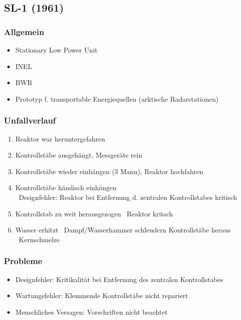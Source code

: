 \documentclass[12pt]{article}
\begin{document}
\subsection{SL-1 (1961)}

\subsubsection{Allgemein}
\begin{itemize}
	\item Stationary Low Power Unit
	\item INEL
	\item BWR
	\item Prototyp f. transportable Energiequellen (arktische Radarstationen)
\end{itemize}

\subsubsection{Unfallverlauf}
\begin{enumerate}
	\item Reaktor war heruntergefahren
	\item Kontrollstäbe ausgehängt, Messgeräte rein
	\item Kontrollstäbe wieder einhängen (3 Mann), Reaktor hochfahren
	\item Kontrollstäbe händisch einhängen\\
		\textrightarrow\ Designfehler: Reaktor bei Entfernung d. zentralen Kontrollstabes kritisch
	\item Kontrollstab zu weit herausgezogen \textrightarrow\ Reaktor kritsch
	\item Wasser erhitzt \textrightarrow\ Dampf/Wasserhammer schleudern Kontrollstäbe heraus \textrightarrow\ Kernschmelze
\end{enumerate}

\subsubsection{Probleme}
\begin{itemize}
	\item Designfehler: Kritikalität bei Entfernung des zentralen Kontrollstabes
	\item Wartungsfehler: Klemmende Kontrollstäbe nicht repariert
	\item Menschliches Versagen: Vorschriften nicht beachtet
\end{itemize}
\end{document}
